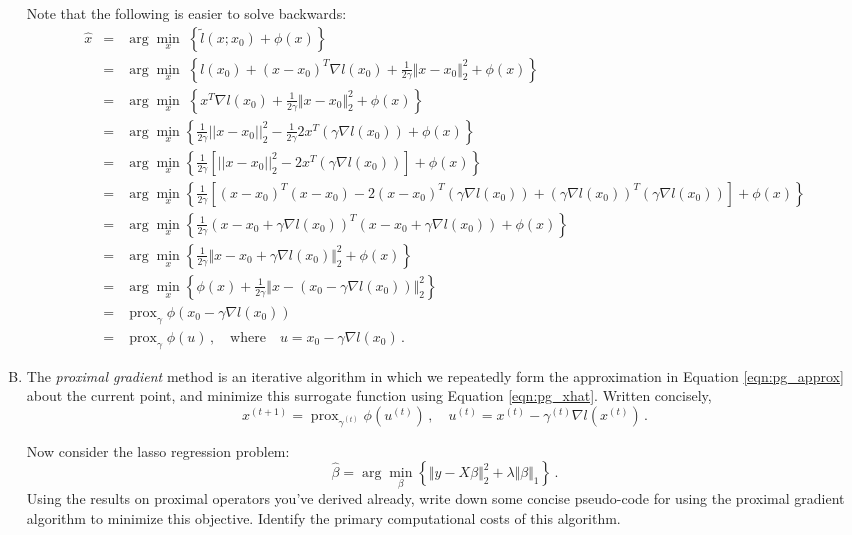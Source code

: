 \documentclass{article}
\newcommand{\prox}{ \mathop{\mathrm{prox}} }
\newcommand{\enorm}[1]{\Vert #1 \Vert_2}
\begin{document}
\begin{enumerate}[(A)]
\color{blue}
Note that the following is easier to solve backwards:
\begin{eqnarray*}
\hat{x} &=& \arg \min_x \; \left\{   \tilde{l}(x; x_0) + \phi(x)  \right\} \\
&=& \arg \min_x \; \left\{  l(x_0) + (x - x_0)^T \nabla l(x_0) + \frac{1}{2\gamma} \enorm{x - x_0}^2 + \phi(x)  \right\} \\
&=& \arg \min_x \; \left\{ x ^T \nabla l(x_0) + \frac{1}{2\gamma} \enorm{x - x_0}^2 + \phi(x)  \right\} \\
&=& \arg \min_{x} \left\{  \frac{1}{2\gamma} ||x - x_0||^2_2 - \frac{1}{2\gamma} 2x^T(\gamma \nabla l(x_0))  + \phi(x) \right\} \\
&=& \arg \min_{x} \left\{ \frac{1}{2\gamma} \left[ ||x - x_0||^2_2 - 2x^T(\gamma \nabla l(x_0))  \right] + \phi(x) \right\} \\
&=& \arg \min_{x} \left\{ \frac{1}{2\gamma} \left[ (x - x_0)^T(x - x_0) - 2(x - x_0)^T(\gamma \nabla l(x_0)) + ( \gamma \nabla l(x_0))^T(\gamma \nabla l(x_0)) \right] + \phi(x) \right\} \\
&=& \arg \min_{x} \left\{ \frac{1}{2\gamma} (x - x_0 + \gamma \nabla l(x_0))^T(x - x_0 + \gamma \nabla l(x_0)) + \phi(x) \right\} \\
&=& \arg \min_{x} \left\{ \frac{1}{2\gamma} \enorm{x - x_0 + \gamma \nabla l(x_0)}^2 + \phi(x) \right\} \\
&=& \arg \min_{x} \left\{  \phi(x)+ \frac{1}{2\gamma} \enorm{x - (x_0 - \gamma \nabla l(x_0))}^2  \right\} \\
&=& \prox_{\gamma} \phi(x_0 - \gamma \nabla l(x_0)) \\ 
&=& \prox_{\gamma} \phi(u) \, , \quad \mbox{where} \quad u = x_0 - \gamma \nabla l(x_0) \, .
\end{eqnarray*}
\color{black}

\item The \textit{proximal gradient} method is an iterative algorithm in which we repeatedly form the approximation in Equation \ref{eqn:pg_approx} about the current point, and minimize this surrogate function using Equation \ref{eqn:pg_xhat}.  Written concisely,
$$
x^{(t+1)} = \prox_{\gamma^{(t)}} \phi(u^{(t)}) \, , \quad u^{(t)} = x^{(t)} - \gamma^{(t)} \nabla l(x^{(t)}) \, .
$$

Now consider the lasso regression problem:
$$
\hat{\beta} = \arg \min_{\beta} \left\{  \enorm{y - X\beta}^2 + \lambda \Vert \beta \Vert_1 \right\} \, .
$$
Using the results on proximal operators you've derived already, write down some concise pseudo-code for using the proximal gradient algorithm to minimize this objective.  Identify the primary computational costs of this algorithm.



\end{enumerate}
\end{document}
